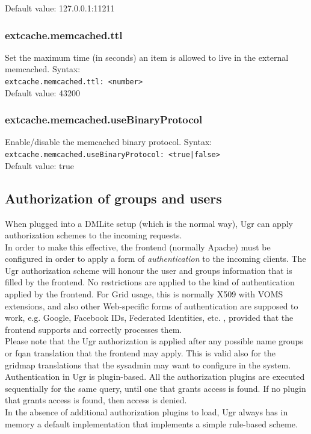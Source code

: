 \documentclass[12pt]{article} %
\begin{document}
Default value: 127.0.0.1:11211

\subsubsection{extcache.memcached.ttl}
Set the maximum time (in seconds) an item is allowed to live in the external memcached.
Syntax:\\
\lstinline"extcache.memcached.ttl: <number>"\\
Default value: 43200\\

\subsubsection{extcache.memcached.useBinaryProtocol}
Enable/disable the memcached binary protocol.
Syntax:\\
\lstinline"extcache.memcached.useBinaryProtocol: <true|false>"\\
Default value: true\\






\subsection{Authorization of groups and users}

When plugged into a DMLite setup (which is the normal way), Ugr can apply authorization schemes to the incoming requests.\\
In order to make this effective, the frontend (normally Apache) must be configured in order to apply a form of \textit{authentication} to the incoming clients. The Ugr authorization scheme will
honour the user and groups information that is filled by the frontend. No restrictions are applied to the kind of authentication applied by the frontend. For Grid usage, this is normally X509 with
VOMS extensions, and also other Web-specific forms of authentication are supposed to work, e.g. Google, Facebook IDs, Federated Identities, etc. , provided that the frontend supports and correctly processes them.\\
Please note that the Ugr authorization is applied after any possible name groups or fqan translation that the frontend may apply. This is valid also for the gridmap translations that the sysadmin may want to configure in the system.\\
Authentication in Ugr is plugin-based. All the authorization plugins are executed sequentially for the same query, until one that grants access is found. If no plugin that grants access is found, then access is denied.\\
In the absence of additional authorization plugins to load, Ugr always has in memory a default implementation that implements a simple rule-based scheme.\\
\end{document}
